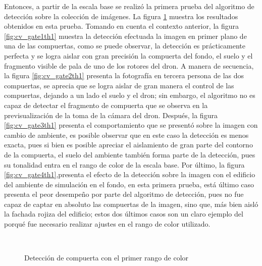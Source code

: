 Entonces, a partir de la escala base se realizó la primera prueba del algoritmo de detección sobre la colección de imágenes. La figura \ref{fig:cv_gatesth1} muestra los resultados obtenidos en esta prueba. Tomando en cuenta el contexto anterior, la figura \ref{fig:cv_gate1th1} muestra la detección efectuada la imagen en primer plano de una de las compuertas, como se puede observar, la detección es prácticamente perfecta y se logra aislar con gran precisión la compuerta del fondo, el suelo y el fragmento visible de pala de uno de los rotores del dron. A manera de secuencia, la figura \ref{fig:cv_gate2th1} presenta la fotografía en tercera persona de las dos compuertas, se aprecia que se logra aislar de gran manera el control de las compuertas, dejando a un lado el suelo y el dron;  sin embargo, el algoritmo no es capaz de detectar el fragmento de compuerta que se observa en la previsualización de la toma de la cámara del dron. Después, la figura \ref{fig:cv_gate3th1} presenta el comportamiento que se presentó sobre la imagen con cambio de ambiente, es posible observar que en este caso la detección es menos exacta, pues si bien es posible apreciar el aislamiento de gran parte del contorno de la compuerta, el suelo del ambiente también forma parte de la detección, pues su tonalidad entra en el rango de color de la escala base. Por último, la figura \ref{fig:cv_gate4th1},presenta el efecto de la detección sobre la imagen con el edificio del ambiente de simulación en el fondo, en esta primera prueba, está último caso presenta el peor desempeño por parte del algoritmo de detección, pues no fue capaz de captar en absoluto las compuertas de la imagen, sino que, más bien aisló la fachada rojiza del edificio; estos dos últimos casos son un claro ejemplo del porqué fue necesario realizar ajustes en el rango de color utilizado.


\begin{figure}[ht]
    \centering
    \hfill
    \\
    \hfill
    \hfill

    \caption{Detección de compuerta con el primer rango de color}
    \label{fig:cv_gatesth1}
\end{figure}

